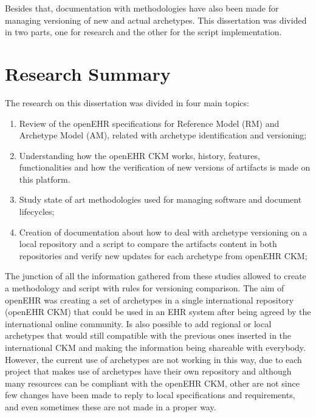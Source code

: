 \documentclass[mim_thesis.tex]{subfiles}
\begin{document}
Besides that, documentation with methodologies have also been made for managing versioning of new and actual archetypes. This dissertation was divided in two parts, one for research and the other for the script implementation. 



\section{Research Summary}

The research on this dissertation was divided in four main topics: 
\begin{enumerate}[noitemsep]
\item  Review of the openEHR specifications for Reference Model (RM) and 
Archetype Model (AM), related with archetype identification and versioning; 

\item Understanding how the openEHR CKM works, history, features, functionalities and how the verification of new versions of artifacts is made on this platform.

\item Study state of art methodologies used for managing software and document lifecycles;

\item Creation of documentation about how to deal with archetype versioning on a local repository and a script to compare the artifacts content in both repositories and verify new updates for each archetype from openEHR CKM; 

\end{enumerate}

The junction of all the information gathered from these studies allowed to create a methodology and script with rules for versioning comparison. The aim of openEHR was creating a set of archetypes in a single international repository (openEHR CKM) that could be used in an EHR system after being agreed by the international online community. Is also possible to add regional or local archetypes that would still compatible with the previous ones inserted in the international CKM and making the information being shareable with everybody. However, the current use of archetypes are not working in this way, due to each project that makes use of archetypes have their own repository and although many resources can be compliant with the openEHR CKM, other are not since few changes have been made to reply to local specifications and requirements, and even sometimes these are not made in a proper way. 
\end{document}
